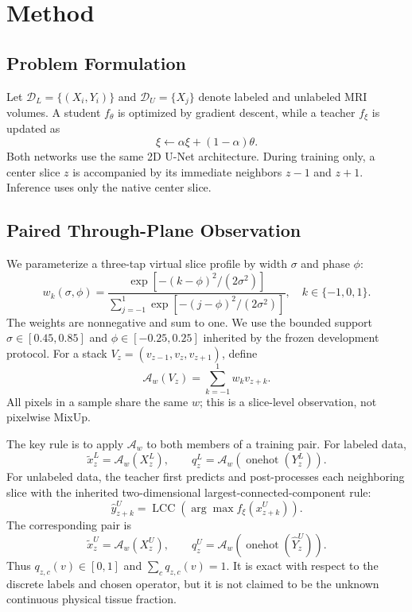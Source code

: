 \section{Method}

\subsection{Problem Formulation}
Let $\mathcal D_L=\{(X_i,Y_i)\}$ and $\mathcal D_U=\{X_j\}$ denote labeled and unlabeled MRI volumes. A student $f_\theta$ is optimized by gradient descent, while a teacher $f_\xi$ is updated as
\begin{equation}
\xi \leftarrow \alpha\xi+(1-\alpha)\theta.
\end{equation}
Both networks use the same 2D U-Net architecture. During training only, a center slice $z$ is accompanied by its immediate neighbors $z-1$ and $z+1$. Inference uses only the native center slice.

\subsection{Paired Through-Plane Observation}
We parameterize a three-tap virtual slice profile by width $\sigma$ and phase $\phi$:
\begin{equation}
w_k(\sigma,\phi)=
\frac{\exp\!\left[-(k-\phi)^2/(2\sigma^2)\right]}
{\sum_{j=-1}^{1}\exp\!\left[-(j-\phi)^2/(2\sigma^2)\right]},
\quad k\in\{-1,0,1\}.
\label{eq:profile}
\end{equation}
The weights are nonnegative and sum to one. We use the bounded support $\sigma\in[0.45,0.85]$ and $\phi\in[-0.25,0.25]$ inherited by the frozen development protocol. For a stack $V_z=(v_{z-1},v_z,v_{z+1})$, define
\begin{equation}
\mathcal A_w(V_z)=\sum_{k=-1}^{1}w_kv_{z+k}.
\label{eq:operator}
\end{equation}
All pixels in a sample share the same $w$; this is a slice-level observation, not pixelwise MixUp.

The key rule is to apply $\mathcal A_w$ to both members of a training pair. For labeled data,
\begin{equation}
\widetilde x_z^L=\mathcal A_w(X_z^L),\qquad
q_z^L=\mathcal A_w\!\left(\operatorname{onehot}(Y_z^L)\right).
\label{eq:labeled_pair}
\end{equation}
For unlabeled data, the teacher first predicts and post-processes each neighboring slice with the inherited two-dimensional largest-connected-component rule:
\begin{equation}
\widehat y_{z+k}^U=\operatorname{LCC}
\left(\arg\max f_\xi(x_{z+k}^U)\right).
\end{equation}
The corresponding pair is
\begin{equation}
\widetilde x_z^U=\mathcal A_w(X_z^U),\qquad
q_z^U=\mathcal A_w\!\left(\operatorname{onehot}(\widehat Y_z^U)\right).
\label{eq:unlabeled_pair}
\end{equation}
Thus $q_{z,c}(v)\in[0,1]$ and $\sum_cq_{z,c}(v)=1$. It is exact with respect to the discrete labels and chosen operator, but it is not claimed to be the unknown continuous physical tissue fraction.

